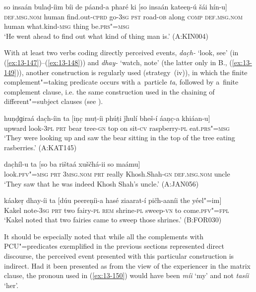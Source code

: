 \begin{exe}
\ex
\label{ex:13-146}
\gll so insaán bulaḍ-íim bíi de páand-a  pharé ki [so insaán kateeṇ-ú
  šái  hín-u] \\
\textsc{def.msg.nom} human find.out-\textsc{cprd} go-\textsc{3sg} \textsc{pst} road-\textsc{ob}  along \textsc{comp} \textsc{def.msg.nom} human what.kind-\textsc{msg} thing be.\textsc{prs"=msg} \\
\glt `He went ahead to find out what kind of thing man is.' (A:KIN004) 
\end{exe}

 With at least two verbs coding directly perceived events, \textit{dac̣h-} `look, see' (in (\ref{ex:13-147})--(\ref{ex:13-148})) and \textit{dhay-} `watch, note' (the latter only in B., (\ref{ex:13-149})), another construction is regularly used (strategy~(iv)), in which the finite complement"=taking predicate occurs with a~particle \textit{ta}, followed by a~finite complement clause, i.e. the same construction used in the chaining of different"=subject clauses (see ). 

\begin{exe}
\ex
\label{ex:13-147}
\gll huṇḍɡiraá dac̣h-íin ta [iṇc̣ muṭ-íi phúṭi ǰhulí  bheš-í áaṇc̣-a khiáan-u] \\
upward look-\textsc{3pl} \textsc{prt} bear tree-\textsc{gn} top on sit-\textsc{cv} raspberry-\textsc{pl} eat.\textsc{prs"=msg}  \\
\glt `They were looking up and saw the bear sitting in the top of the tree eating rasberries.' (A:KAT145)

\ex
\label{ex:13-148}
\gll dac̣híl-u ta [so ba rištaá  xuščhá-ii so maámu] \\
look.\textsc{pfv"=msg} \textsc{prt} \textsc{3msg.nom} \textsc{prt} really Khosh.Shah-\textsc{gn} \textsc{def.msg.nom} uncle  \\
\glt `They saw that he was indeed Khosh Shah's uncle.' (A:JAN056)

\ex
\label{ex:13-149}
\gll káakeṛ dhay-íi ta [dúu peereṇíi-a hasé ziaarat-í  pičh-aaníi the yéel"=im] \\
Kakel note-\textsc{3sg} \textsc{prt} two fairy-\textsc{pl}  \textsc{rem} shrine-\textsc{pl} sweep-\textsc{vn} to come.\textsc{pfv"=fpl} \\
\glt `Kakel noted that two fairies came to sweep those shrines.' (B:FOR030) 
\end{exe}

It should be especially noted that while all the complements with PCU"=predicates exemplified in the previous sections represented direct discourse, the perceived event presented with this particular construction is indirect. Had it been presented as from the view of the experiencer in the matrix clause, the pronoun used in (\ref{ex:13-150}) would have been \textit{míi} `my' and not \textit{tasíi} `her'.

